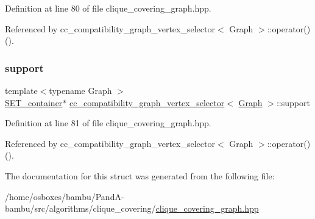 Definition at line 80 of file clique\+\_\+covering\+\_\+graph.\+hpp.



Referenced by cc\+\_\+compatibility\+\_\+graph\+\_\+vertex\+\_\+selector$<$ Graph $>$\+::operator()().

\mbox{\label{structcc__compatibility__graph__vertex__selector_a81ef668d369aa3cfd7c13074e77f55fb}} 
\subsubsection{\texorpdfstring{support}{support}}
{\footnotesize\ttfamily template$<$typename Graph $>$ \\
\hyperlink{structcc__compatibility__graph__vertex__selector_abe217f0679bd4c93a9492844634d4e82}{S\+E\+T\+\_\+container}$\ast$ \hyperlink{structcc__compatibility__graph__vertex__selector}{cc\+\_\+compatibility\+\_\+graph\+\_\+vertex\+\_\+selector}$<$ \hyperlink{structGraph}{Graph} $>$\+::support\hspace{0.3cm}{\ttfamily [private]}}



Definition at line 81 of file clique\+\_\+covering\+\_\+graph.\+hpp.



Referenced by cc\+\_\+compatibility\+\_\+graph\+\_\+vertex\+\_\+selector$<$ Graph $>$\+::operator()().



The documentation for this struct was generated from the following file\+:\begin{DoxyCompactItemize}
\item 
/home/osboxes/bambu/\+Pand\+A-\/bambu/src/algorithms/clique\+\_\+covering/\hyperlink{clique__covering__graph_8hpp}{clique\+\_\+covering\+\_\+graph.\+hpp}\end{DoxyCompactItemize}
